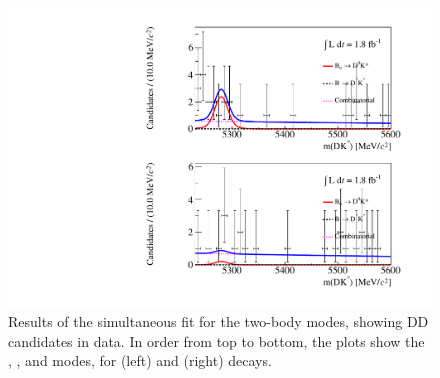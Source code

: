 \begin{figure}
\includegraphics[trim = 0 0 0 0.5\imageheight{},clip,width=0.5\linewidth]{figures/results/canvas_d2pik_DD_run2.pdf}
\caption{Results of the simultaneous fit for the two-body modes, showing DD candidates in \runtwo data. In order from top to bottom, the plots show the \kpi, \kk, \pipi and \pik modes, for \Bp (left) and \Bm (right) decays.}
\label{results2body}
\end{figure}

